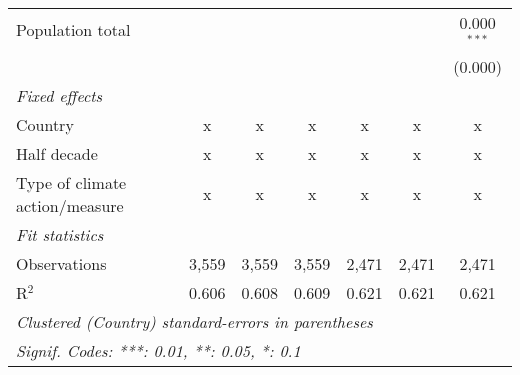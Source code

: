 \begin{tabular}{lcccccc}
   Population total                                                     &         &                &                &                &                & 0.000$^{***}$\\   
                                                                        &         &                &                &                &                & (0.000)\\   
   \emph{Fixed effects}\\
   Country                                                              & x       & x              & x              & x              & x              & x\\  
   Half decade                                                          & x       & x              & x              & x              & x              & x\\  
   Type of climate action/measure                                       & x       & x              & x              & x              & x              & x\\  
   \midrule \emph{Fit statistics}\\
   Observations                                                         & 3,559   & 3,559          & 3,559          & 2,471          & 2,471          & 2,471\\  
   R$^2$                                                                & 0.606   & 0.608          & 0.609          & 0.621          & 0.621          & 0.621\\  
   \midrule
   \multicolumn{7}{l}{\emph{Clustered (Country) standard-errors in parentheses}}\\
   \multicolumn{7}{l}{\emph{Signif. Codes: ***: 0.01, **: 0.05, *: 0.1}}\\
\end{tabular}
\par\endgroup


